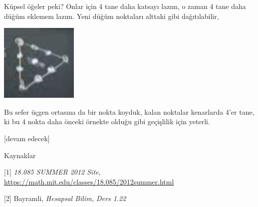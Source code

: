 \documentclass[12pt,fleqn]{article}\usepackage{../../common}
\begin{document}
Küpsel öğeler peki? Onlar için 4 tane daha katsayı lazım, o zaman 4 tane
daha düğüm eklemem lazım. Yeni düğüm noktaları alttaki gibi dağıtılabilir,

\includegraphics[width=10em]{compscieng_1_27_07.png}

Bu sefer üçgen ortasına da bir nokta koyduk, kalan noktalar kenarlarda 4'er
tane, ki bu 4 nokta daha önceki örnekte olduğu gibi geçişlilik için yeterli.

[devam edecek]


Kaynaklar

[1] {\em 18.085 SUMMER 2012 Site},
    \url{https://math.mit.edu/classes/18.085/2012summer.html}

[2] Bayramli, {\em Hesapsal Bilim, Ders 1.22} 
    
\end{document}
